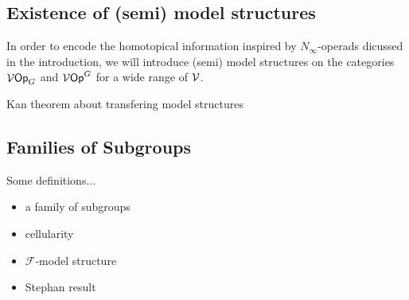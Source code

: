 \documentclass[a4paper,10pt]{article}%
\begin{document}
\subsection{Existence of (semi) model structures} 

 
In order to encode the homotopical information inspired by $N_\infty$-operads dicussed in the introduction, we will introduce (semi) model structures on the categories $\mathcal V\mathsf{Op}_G$ and $\mathcal V\mathsf{Op}^G$ for a wide range of $\mathcal V$. 


\begin{theorem}
  Kan theorem about transfering model structures
\end{theorem}

\subsection{Families of Subgroups}


\renewcommand{\F}{\ensuremath{\mathcal F}} 

\begin{definition} Some definitions...
  \begin{itemize}
  \item a family of subgroups
  \item cellularity
  \item $\F$-model structure
  \item Stephan result
  \end{itemize}
\end{definition}
\end{document}
